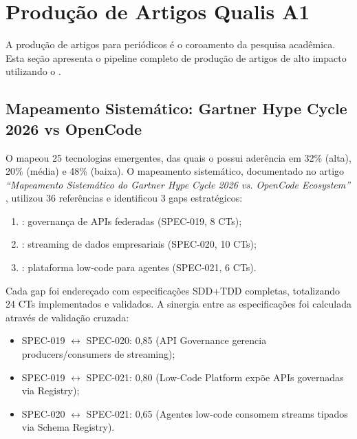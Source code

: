 \section{Produção de Artigos Qualis A1}
\label{sec:producao-artigos-qualis}
\nivelphd

A produção de artigos para periódicos \qualisA{} é o coroamento da pesquisa
acadêmica. Esta seção apresenta o pipeline completo de produção de artigos
de alto impacto utilizando o \opencodeeco{} \cite{laranjeira2026gartner,
laranjeira2026cora, laranjeira2026opencode}.

\subsection{Mapeamento Sistemático: Gartner Hype Cycle 2026 vs OpenCode}

O  \cite{gartner2026hype}
mapeou 25 tecnologias emergentes, das quais o \opencodeeco{} possui aderência
em 32\% (alta), 20\% (média) e 48\% (baixa). O mapeamento sistemático,
documentado no artigo \textit{``Mapeamento Sistemático do Gartner Hype Cycle
2026 vs. OpenCode Ecosystem''} \cite{laranjeira2026gartner}, utilizou 36
referências e identificou 3 gaps estratégicos:

\begin{enumerate}
\item {}: governança de APIs
      federadas (SPEC-019, 8 CTs);
\item {}: streaming de dados
      empresariais (SPEC-020, 10 CTs);
\item {}: plataforma low-code para
      agentes (SPEC-021, 6 CTs).
\end{enumerate}

Cada gap foi endereçado com especificações SDD+TDD completas, totalizando
24 CTs implementados e validados. A sinergia entre as especificações foi
calculada através de validação cruzada:
\begin{itemize}
\item SPEC-019 $\leftrightarrow$ SPEC-020: 0,85 (API Governance gerencia
      producers/consumers de streaming);
\item SPEC-019 $\leftrightarrow$ SPEC-021: 0,80 (Low-Code Platform expõe APIs
      governadas via Registry);
\item SPEC-020 $\leftrightarrow$ SPEC-021: 0,65 (Agentes low-code consomem
      streams tipados via Schema Registry).
\end{itemize}

